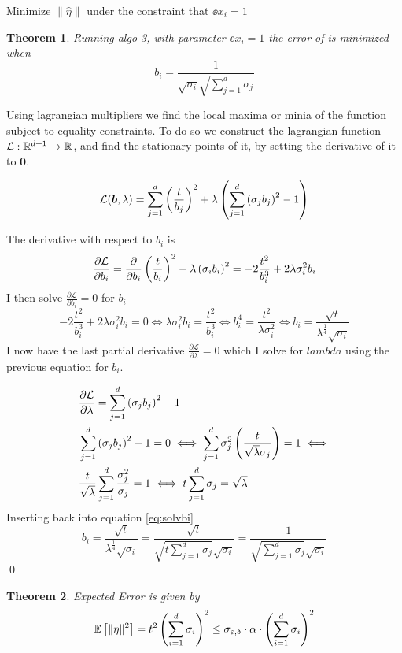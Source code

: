 \documentclass[a4paper,12pt]{article}
\renewenvironment{proof}{{\textit{Proof} \\}}{\qed}
\newtheorem{theorem}{Theorem}
\begin{document}
Minimize $\| \hat{\eta} \|$ under the constraint that $\ee{x_i} = 1$  
\begin{theorem}
Running algo 3, with parameter $\ee{x_i} = 1$ the error of is minimized when 
\[
    b_i = \frac{1}{\sqrt{\sigma_i} \sqrt{\sum_{j=1}^d \sigma_j}}
\]
\end{theorem}
\begin{proof}
Using lagrangian multipliers we find the local maxima or 
minia of the function subject to equality constraints.
To do so we construct the lagrangian function $\mathcal{L}: \mathbb{R}^{d+1} \rightarrow \mathbb{R}$, and find the stationary
points of it, by setting the derivative of it to $\bm{0}$.

\[
    \mathcal{L}(\bm{b},\lambda) = \sum_{j = 1}^{d} \left (\frac{t}{b_j}\right)^2 
    + \lambda \left ( \sum_{j=1}^d \left (\sigma_j b_j\right)^2 - 1\right)
\]

The derivative with respect to $b_i$ is 
\[
    \frac{\partial \mathcal{L}}{\partial b_i} = 
    \frac{\partial}{\partial b_i} \left (\frac{t}{b_i}\right)^2
    + \lambda \left (\sigma_i b_i\right)^2 =
    -2\frac{t^2}{b_i^3} + 2 \lambda \sigma_i^2b_i
\]
I then solve $\frac{\partial \mathcal{L}}{\partial b_i} = 0$ for $b_i$
\begin{equation}
\label{eq:solvbi}
    -2\frac{t^2}{b_i^3} + 2 \lambda \sigma_i^2b_i = 0 \iff
    \lambda \sigma_i^2b_i = \frac{t^2}{b_i^3} \iff 
    b_i^4 = \frac{t^2}{\lambda \sigma_i^2} \iff 
    b_i = \frac{\sqrt{t}}{\lambda^{\frac{1}{4}} \sqrt{\sigma_i}} 
\end{equation}
I now have the last partial derivative 
$\frac{\partial \mathcal{L}}{\partial \lambda} = 0$ which I solve for
$lambda$ using the previous equation for $b_i$.

\begin{align*}
    &\frac{\partial \mathcal{L}}{\partial \lambda} = 
    \sum_{j=1}^d \left ( \sigma_j b_j\right)^2 - 1 \\
    &\sum_{j=1}^d \left ( \sigma_j b_j\right)^2 - 1 = 0 \iff
    \sum_{j=1}^d \sigma_j^2 \left (\frac{t}{\sqrt{\lambda}\sigma_j}\right) = 1 \iff \\
    &\frac{t}{\sqrt{\lambda}} \sum_{j=1}^d \frac{\sigma_j^2}{\sigma_j} = 1 \iff
    t \sum_{j=1}^d \sigma_j = \sqrt{\lambda}
\end{align*}
Inserting back into equation \ref{eq:solvbi}
\[
    b_i = \frac{\sqrt{t}}{\lambda^{\frac{1}{4}} \sqrt{\sigma_i}} =
    \frac{\sqrt{t}}{\sqrt{t \sum_{j=1}^d \sigma_j} \sqrt{\sigma_i}} = 
    \frac{1}{\sqrt{\sum_{j=1}^d \sigma_j} \sqrt{\sigma_i}} 
\]
\end{proof}
\begin{theorem}
    Expected Error is given by
    \[
        \mathbb{E} \left [ \| \eta \|^2 \right] = t^2 \left (\sum_{i=1}^d \sigma_i\right)^2 \le \sigma_{\varepsilon,\delta}  \cdot \alpha \cdot \left (\sum_{i=1}^d \sigma_i\right)^2
    \]
\end{theorem}
\end{document}
